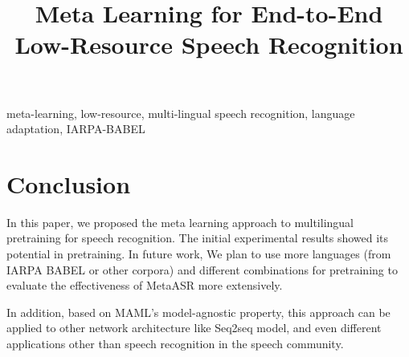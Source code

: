 \documentclass{article}
\title{Meta Learning for End-to-End Low-Resource Speech Recognition}
\begin{document}
%
\maketitle
%
\begin{abstract}
\end{abstract}
%
\begin{keywords}
  meta-learning, low-resource, multi-lingual speech recognition, language adaptation, IARPA-BABEL
\end{keywords}
%





\section{Conclusion}
\label{sec:conclusion}
In this paper, we proposed the meta learning approach to multilingual pretraining for speech recognition. The initial experimental results showed its potential in pretraining. In future work, We plan to use more languages (from IARPA BABEL or other corpora) and different combinations for pretraining to evaluate the effectiveness of MetaASR more extensively. 

In addition, based on MAML's model-agnostic property, this approach can be applied to other network architecture like Seq2seq model, and even different applications other than speech recognition in the speech community.



\end{document}
